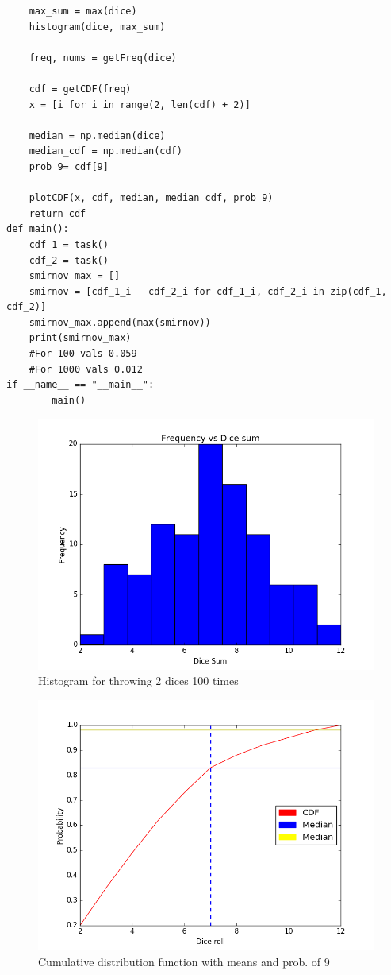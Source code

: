 \documentclass{WeSTassignment}
\begin{document}
\begin{lstlisting}
    max_sum = max(dice)
    histogram(dice, max_sum)

    freq, nums = getFreq(dice)

    cdf = getCDF(freq)
    x = [i for i in range(2, len(cdf) + 2)]

    median = np.median(dice)
    median_cdf = np.median(cdf)
    prob_9= cdf[9]

    plotCDF(x, cdf, median, median_cdf, prob_9)
    return cdf
def main():
    cdf_1 = task()
    cdf_2 = task()
    smirnov_max = []
    smirnov = [cdf_1_i - cdf_2_i for cdf_1_i, cdf_2_i in zip(cdf_1, cdf_2)]
    smirnov_max.append(max(smirnov))
    print(smirnov_max)
    #For 100 vals 0.059
    #For 1000 vals 0.012
if __name__ == "__main__":
        main()
\end{lstlisting}

\begin{figure}[h!]
  \centering
  \includegraphics[scale=0.5]{histogram_100.png}
   \caption{Histogram for throwing 2 dices 100 times}
     \label{fig:dig} 
\end{figure}

\begin{figure}[h!]
  \centering
  \includegraphics[scale=0.5]{dice_med_prob.png}
   \caption{Cumulative distribution function with means and prob. of 9}
     \label{fig:dig} 
\end{figure}
\end{document}
